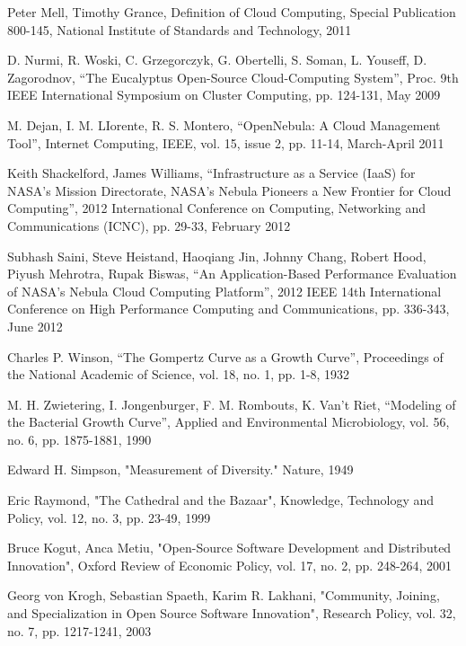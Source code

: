 \documentclass[conference]{IEEEtran}
\begin{document}
\begin{thebibliography}{1} 

Peter Mell, Timothy Grance, Definition of Cloud Computing, Special Publication 800-145, National Institute of Standards and Technology, 2011

D. Nurmi, R. Woski, C. Grzegorczyk, G. Obertelli, S. Soman, L. Youseff, D. Zagorodnov, “The Eucalyptus Open-Source Cloud-Computing System”, Proc. 9th IEEE International Symposium on Cluster Computing, pp. 124-131, May 2009

M. Dejan, I. M. LIorente, R. S. Montero, “OpenNebula: A Cloud Management Tool”, Internet Computing, IEEE, vol. 15, issue 2, pp. 11-14, March-April 2011

Keith Shackelford, James Williams, “Infrastructure as a Service (IaaS) for NASA’s Mission Directorate, NASA’s Nebula Pioneers a New Frontier for Cloud Computing”, 2012 International Conference on Computing, Networking and Communications (ICNC), pp. 29-33, February 2012

Subhash Saini, Steve Heistand, Haoqiang Jin, Johnny Chang, Robert Hood, Piyush Mehrotra, Rupak Biswas, “An Application-Based Performance Evaluation of NASA’s Nebula Cloud Computing Platform”, 2012 IEEE 14th International Conference on High Performance Computing and Communications, pp. 336-343, June 2012

Charles P. Winson, “The Gompertz Curve as a Growth Curve”, Proceedings of the National Academic of Science, vol. 18, no. 1, pp. 1-8, 1932 

M. H. Zwietering, I. Jongenburger, F. M. Rombouts, K. Van’t Riet, “Modeling of the Bacterial Growth Curve”, Applied and Environmental Microbiology, vol. 56, no. 6, pp. 1875-1881, 1990

Edward H. Simpson, "Measurement of Diversity." Nature, 1949

Eric Raymond, "The Cathedral and the Bazaar", Knowledge, Technology and Policy, vol. 12, no. 3, pp. 23-49, 1999

Bruce Kogut, Anca Metiu, "Open-Source Software Development and Distributed Innovation", Oxford Review of Economic Policy, vol. 17, no. 2, pp. 248-264, 2001

Georg von Krogh, Sebastian Spaeth, Karim R. Lakhani, "Community, Joining, and Specialization in Open Source Software Innovation", Research Policy, vol. 32, no. 7, pp. 1217-1241, 2003


\end{thebibliography}
\end{document}
